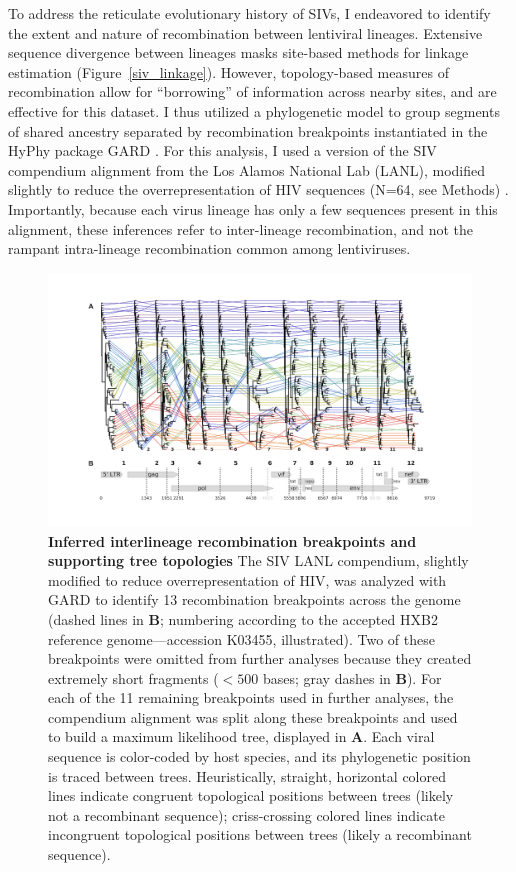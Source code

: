 To address the reticulate evolutionary history of SIVs, I endeavored to identify the extent and nature of recombination between lentiviral lineages.
Extensive sequence divergence between lineages masks site-based methods for linkage estimation (Figure~\ref{siv_linkage}).
However, topology-based measures of recombination allow for “borrowing” of information across nearby sites, and are effective for this dataset.
I thus utilized a phylogenetic model to group segments of shared ancestry separated by recombination breakpoints instantiated in the HyPhy package GARD \citep{kosakovsky2006gard}.
For this analysis, I used a version of the SIV compendium alignment from the Los Alamos National Lab (LANL), modified slightly to reduce the overrepresentation of HIV sequences (N=64, see Methods) \citep{los2012hiv}.
Importantly, because each virus lineage has only a few sequences present in this alignment, these inferences refer to inter-lineage recombination, and not the rampant intra-lineage recombination common among lentiviruses.

\begin{figure}[h!]
  \begin{centering}
    \includegraphics[width=\linewidth]{./png/siv_recombination.png}
  	\caption[Inferred interlineage recombination breakpoints and supporting tree topologies]{\textbf{Inferred interlineage recombination breakpoints and supporting tree topologies }
The SIV LANL compendium, slightly modified to reduce overrepresentation of HIV, was analyzed with GARD to identify 13 recombination breakpoints across the genome (dashed lines in \textbf{B}; numbering according to the accepted HXB2 reference genome---accession K03455, illustrated).
Two of these breakpoints were omitted from further analyses because they created extremely short fragments ($<500$ bases; gray dashes in \textbf{B}).
For each of the 11 remaining breakpoints used in further analyses, the compendium alignment was split along these breakpoints and used to build a maximum likelihood tree, displayed in \textbf{A}.
Each viral sequence is color-coded by host species, and its phylogenetic position is traced between trees.
Heuristically, straight, horizontal colored lines indicate congruent topological positions between trees (likely not a recombinant sequence); criss-crossing colored lines indicate incongruent topological positions between trees (likely a recombinant sequence).
}
  	\label{siv_recombination}
  \end{centering}
\end{figure}

